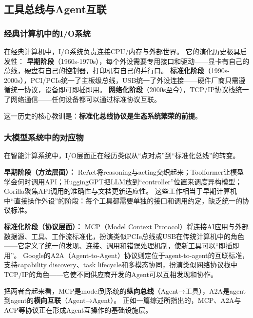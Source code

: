 \subsection{工具总线与Agent互联}
\label{sec:io}

\subsubsection{经典计算机中的I/O系统}

在经典计算机中，I/O系统负责连接CPU/内存与外部世界。
它的演化历史极具启发性：
\textbf{早期阶段}（1960s-1970s），每个外设需要专用接口和驱动——显卡有自己的总线，硬盘有自己的控制器，打印机有自己的并行口。
\textbf{标准化阶段}（1990s-2000s），PCI/PCIe统一了主板级总线，USB统一了外设连接——硬件厂商只需遵循统一协议，设备即可即插即用。
\textbf{网络化阶段}（2000s至今），TCP/IP协议栈统一了网络通信——任何设备都可以通过标准协议互联。

这一历史的核心教训是：\textbf{标准化总线协议是生态系统繁荣的前提}。

\subsubsection{大模型系统中的对应物}

在智能计算系统中，I/O层面正在经历类似从``点对点''到``标准化总线''的转变。

\textbf{早期阶段（方法层面）：}
ReAct将reasoning与acting交织起来\cite{yao2023react}；Toolformer让模型学会何时调用API\cite{schick2023toolformer}；HuggingGPT把LLM放到``controller''位置来调度异构模型\cite{hugginggpt2023}；Gorilla聚焦API调用的准确性与文档更新适应性\cite{patil2024gorilla}。
这些工作相当于早期计算机中``直接操作外设''的阶段：每个工具都需要单独的接口和调用约定，缺乏统一的协议标准。

\textbf{标准化阶段（协议层面）：}
MCP（Model Context Protocol）将连接AI应用与外部数据源、工具、工作流标准化\cite{mcp_intro_2026}，扮演类似PCIe总线或USB在传统计算机中的角色——它定义了统一的发现、连接、调用和错误处理机制，使新工具可以``即插即用''。
Google的A2A（Agent-to-Agent）协议则定位于agent-to-agent的互联标准\cite{google_a2a_2025}，支持capability discovery、task lifecycle和多模态协同，扮演类似网络协议栈中TCP/IP的角色——它使不同供应商开发的Agent可以互相发现和协作。

把两者合起来看，MCP是model到系统的\textbf{纵向总线}（Agent→工具），A2A是agent到agent的\textbf{横向互联}（Agent→Agent）。
正如一篇综述所指出的，MCP、A2A与ACP等协议正在形成Agent互操作的基础设施层\cite{agentprotocols2025}。

